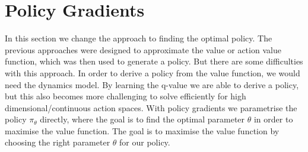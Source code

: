 \section{Policy Gradients} \label{PG}
In this section we change the approach to finding the optimal policy. The previous 
approaches were designed to approximate the value or action value function, which 
was then used to generate a policy. But there are some difficulties with this 
approach. In order to derive a policy from the value 
function, we would need the dynamics model. By learning the q-value we are able to 
derive a policy, but this also becomes more challenging to solve efficiently for 
high dimensional/continuous action spaces. With policy gradients we parametrise the 
policy $\pi_{\theta}$ directly, where the goal is to find the optimal parameter 
$\theta$ in order to maximise the value function.\newline 
The goal is to maximise the value function by choosing the right parameter $\theta$ for our policy. 

